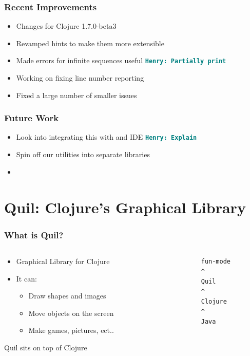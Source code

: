 \documentclass{beamer}
\newcommand{\comment}[1]{{\bf \tt  {#1}}}
\newcommand{\hfcomment}[1]{\textcolor{Teal}{\comment{Henry: {#1}}}}
\begin{document}
\begin{frame}
	\frametitle{Recent Improvements}
	\begin{itemize}
		\item Changes for Clojure 1.7.0-beta3
		\item Revamped hints to make them more extensible
		\item Made errors for infinite sequences useful \hfcomment{Partially print}
		\item Working on fixing line number reporting
		\item Fixed a large number of smaller issues
	\end{itemize}
\end{frame}

\begin{frame}
	\frametitle{Future Work}
	\begin{itemize}
		\item Look into integrating this with and IDE \hfcomment{Explain}
		\item Spin off our utilities into separate libraries
		\item 
	\end{itemize}
\end{frame}




\section{Quil: Clojure's Graphical Library}

\begin{frame}[fragile]
	\frametitle{What is Quil?}

  		\begin{columns}[t]
		\begin{column}{.55\textwidth}
		\begin{itemize}
  		\item Graphical Library for Clojure
  		\item It can:
  		\begin{itemize}
  	 		\item Draw shapes and images
  	 		\item Move objects on the screen
  	 		\item Make games, pictures, ect..
  		\end{itemize}
  		\end{itemize}
  		 Quil sits on top of Clojure
		\end{column}
		\begin{column}{.45\textwidth}
			\begin{verbatim}
			fun-mode
			^
			Quil
			^
			Clojure
			^
			Java
			\end{verbatim}
		\end{column}
		\end{columns}
\end{frame}
\end{document}

